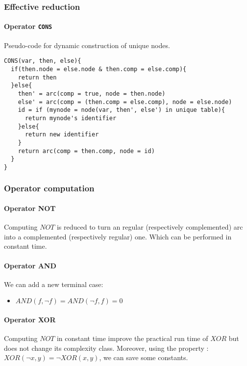 \documentclass[a4paper,10pt]{article}
\begin{document}
\subsubsection{Effective reduction}

\paragraph{Operator \texttt{CONS}\\}

Pseudo-code for dynamic construction of unique nodes.

\begin{lstlisting}
CONS(var, then, else){
  if(then.node = else.node & then.comp = else.comp){
    return then
  }else{
    then' = arc(comp = true, node = then.node)
    else' = arc(comp = (then.comp = else.comp), node = else.node)
    id = if (mynode = node(var, then', else') in unique table){
      return mynode's identifier
    }else{
      return new identifier
    }
  	return arc(comp = then.comp, node = id)
  }
}
\end{lstlisting}

\subsubsection{Operator computation}
\paragraph{Operator NOT}
Computing $NOT$ is reduced to turn an regular (respectively complemented) arc into a complemented (respectively regular) one.
Which can be performed in constant time.

\paragraph{Operator AND}
We can add a new terminal case:\begin{itemize}
\item $AND(f, \lnot f) = AND(\lnot f, f) = 0$
\end{itemize}

\paragraph{Operator XOR}
Computing $NOT$ in constant time improve the practical run time of $XOR$ but does not change its complexity class.
Moreover, using the property : $XOR(\lnot x, y) = \lnot XOR(x, y)$, we can save some constants.
\end{document}
